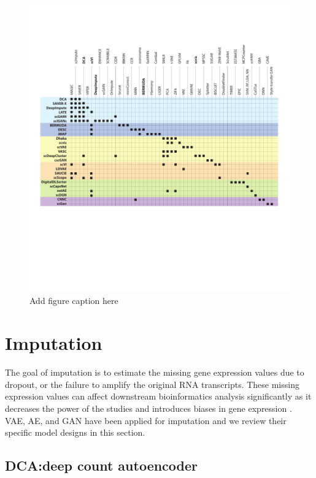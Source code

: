 \documentclass[
]{book}
\begin{document}
\begin{figure}

{\centering \includegraphics[width=26.19in]{Figures/Figure3} 

}

\caption{Add figure caption here}\label{fig:Figure3}
\end{figure}

\hypertarget{ch-5-1}{%
\section{Imputation}\label{ch-5-1}}

The goal of imputation is to estimate the missing gene expression values due to dropout, or the failure to amplify the original RNA transcripts. These missing expression values can affect downstream bioinformatics analysis significantly as it decreases the power of the studies and introduces biases in gene expression \citep{RN46}. VAE, AE, and GAN have been applied for imputation and we review their specific model designs in this section.

\hypertarget{ch-5-1-1}{%
\subsection{DCA:deep count autoencoder}\label{ch-5-1-1}}
\end{document}

